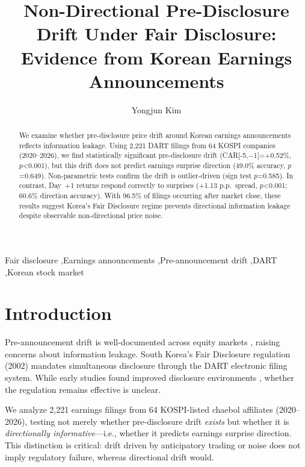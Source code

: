 \documentclass[review,authoryear]{elsarticle}
\begin{document}
\begin{frontmatter}

\title{Non-Directional Pre-Disclosure Drift Under Fair Disclosure: Evidence from Korean Earnings Announcements}

\author{Yongjun Kim}

\begin{abstract}
We examine whether pre-disclosure price drift around Korean earnings announcements reflects information leakage. Using 2,221 DART filings from 64 KOSPI companies (2020--2026), we find statistically significant pre-disclosure drift (CAR[-5,$-$1]=+0.52\%, $p$<0.001), but this drift does not predict earnings surprise direction (49.0\% accuracy, $p$=0.649). Non-parametric tests confirm the drift is outlier-driven (sign test $p$=0.585). In contrast, Day~+1 returns respond correctly to surprises (+1.13 p.p.\ spread, $p$<0.001; 60.6\% direction accuracy). With 96.5\% of filings occurring after market close, these results suggest Korea's Fair Disclosure regime prevents directional information leakage despite observable non-directional price noise.
\end{abstract}

\begin{keyword}
Fair disclosure \sep Earnings announcements \sep Pre-announcement drift \sep DART \sep Korean stock market
\end{keyword}

\end{frontmatter}

\section{Introduction}

Pre-announcement drift is well-documented across equity markets \citep{kaniel2012individual}, raising concerns about information leakage. South Korea's Fair Disclosure regulation (2002) mandates simultaneous disclosure through the DART electronic filing system. While early studies found improved disclosure environments \citep{yun2012fair, park2020disclosure}, whether the regulation remains effective is unclear.

We analyze 2,221 earnings filings from 64 KOSPI-listed chaebol affiliates (2020--2026), testing not merely whether pre-disclosure drift \textit{exists} but whether it is \textit{directionally informative}---i.e., whether it predicts earnings surprise direction. This distinction is critical: drift driven by anticipatory trading or noise does not imply regulatory failure, whereas directional drift would.
\end{document}
